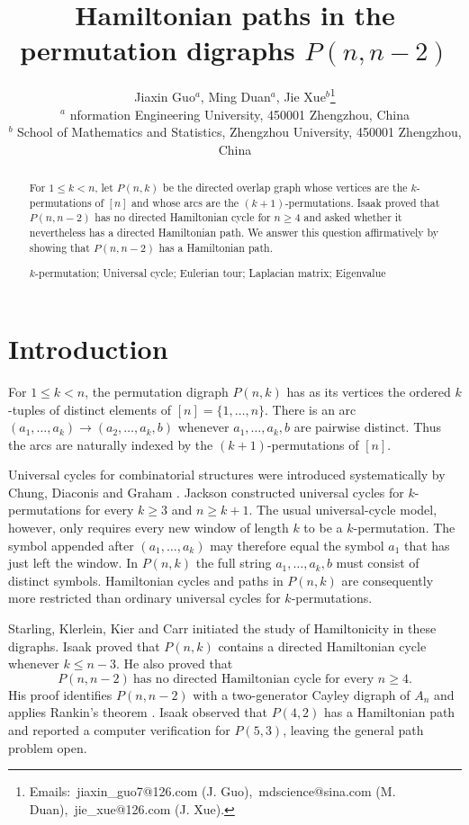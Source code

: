 \documentclass[4pt]{article} %
\title{Hamiltonian paths in the permutation digraphs $P(n,n-2)$}
\author{Jiaxin Guo$^{a}$, Ming Duan$^{a}$, Jie Xue$^{b}$\thanks{Emails:~jiaxin\_guo7@126.com (J. Guo),~mdscience@sina.com (M. Duan),~jie\_xue@126.com (J. Xue).}
\\
{\footnotesize $^a$ nformation Engineering University, 450001 Zhengzhou, China}\\
{\footnotesize $^b$ School of Mathematics and Statistics, Zhengzhou University, 450001 Zhengzhou, China}
}
\date{} %
\begin{document}
\maketitle

\begin{abstract}
For $1\leq k<n$, let $P(n,k)$ be the directed overlap graph whose vertices
are the $k$-permutations of $[n]$ and whose arcs are the
$(k+1)$-permutations. Isaak proved that $P(n,n-2)$ has no directed
Hamiltonian cycle for $n\geq4$ and asked whether it nevertheless has a
directed Hamiltonian path. We answer this question affirmatively by showing that $P(n,n-2)$ has a Hamiltonian path.
\bigskip

 $k$-permutation; Universal cycle; Eulerian tour; Laplacian matrix; Eigenvalue
\end{abstract}

\section{Introduction}

For $1\leq k<n$, the permutation digraph $P(n,k)$ has as its vertices the
ordered $k$-tuples of distinct elements of $[n]=\{1,\ldots,n\}$. There is an
arc
$
 (a_1,\ldots,a_k)\longrightarrow(a_2,\ldots,a_k,b)
$
whenever $a_1,\ldots,a_k,b$ are pairwise distinct. Thus the arcs are
naturally indexed by the $(k+1)$-permutations of $[n]$.

Universal cycles for combinatorial structures were introduced systematically
by Chung, Diaconis and Graham \cite{Chung1992}. Jackson \cite{Jackson1993}
constructed universal cycles for $k$-permutations for every $k\geq3$ and
$n\geq k+1$. The usual universal-cycle model, however, only requires every
new window of length $k$ to be a $k$-permutation. The symbol appended after
$(a_1,\ldots,a_k)$ may therefore equal the symbol $a_1$ that has just left
the window. In $P(n,k)$ the full string $a_1,\ldots,a_k,b$ must consist of
distinct symbols. Hamiltonian cycles and paths in $P(n,k)$ are consequently
more restricted than ordinary universal cycles for $k$-permutations.

Starling, Klerlein, Kier and Carr \cite{Starling2003} initiated the study of
Hamiltonicity in these digraphs. Isaak \cite{Isaak2006} proved that $P(n,k)$
contains a directed Hamiltonian cycle whenever $k\leq n-3$. He also proved
that
\[
 P(n,n-2)\ \text{has no directed Hamiltonian cycle for every }n\geq4.
\]
His proof identifies $P(n,n-2)$ with a two-generator Cayley digraph of $A_n$
and applies Rankin's theorem \cite{Rankin1948,Swan1999}. Isaak observed that
$P(4,2)$ has a Hamiltonian path and reported a computer verification for
$P(5,3)$, leaving the general path problem open.
\end{document}
